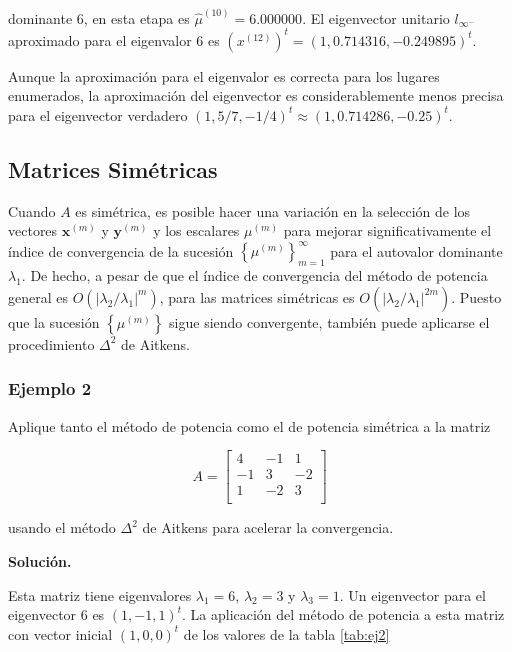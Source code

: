 \documentclass{report}
\numberwithin{subsection}{section} %
\begin{document}
    dominante 6, en esta etapa es $\hat{\mu}^{(10)} = 6.000000$. El eigenvector unitario $l_{\infty^-}$ aproximado para el eigenvalor 6 es $(x^{(12)})^t = (1, 0.714316,-0.249895)^t.$
    
    Aunque la aproximación para el eigenvalor es correcta para los lugares enumerados, la aproximación del eigenvector es considerablemente menos precisa para el eigenvector verdadero $(1, 5/7, -1/4)^t  \approx (1, 0.714286, -0.25)^t.$

\subsection{\textnormal{Matrices Simétricas}}

Cuando $A$ es simétrica, es posible hacer una variación en la selección de los vectores $\textbf{x}^{\left( m \right)}$ y $\textbf{y}^{\left( m \right)}$ y los escalares $\mu^{\left( m \right)}$ para mejorar significativamente el índice de convergencia de la sucesión $\left\{ \mu^{\left( m \right)} \right\}_{m=1}^{\infty}$ para el autovalor dominante $\lambda_{1}$. De hecho, a pesar de que el índice de convergencia del método de potencia general es $O\left( \left| \lambda_{2} / \lambda_{1} \right|^{m} \right)$, para las matrices simétricas es $O\left( \left| \lambda_{2} / \lambda_{1} \right|^{2m} \right)$. Puesto que la sucesión $\left\{ \mu^{\left( m \right)} \right\}$ sigue siendo convergente, también puede aplicarse el procedimiento $\Delta ^{2}$ de Aitkens.

\subsubsection*{Ejemplo 2} %

    Aplique tanto el método de potencia como el de potencia simétrica a la matriz

    $$A =\begin{bmatrix}
        4 & -1 & 1 \\
        -1 & 3 & -2 \\
        1 & -2 & 3 \\
    \end{bmatrix}$$

    usando el método $\Delta^2$ de Aitkens para acelerar la convergencia.

    {\bf Solución.}

    Esta matriz tiene eigenvalores $\lambda_1 = 6$, $\lambda_2 = 3$ y $\lambda_3 = 1$. Un eigenvector para el eigenvector 6 es $(1,-1, 1)^t$. La aplicación del método de potencia a esta matriz con vector inicial $(1, 0, 0)^t$ de los valores de la tabla \ref{tab:ej2}
\end{document}
